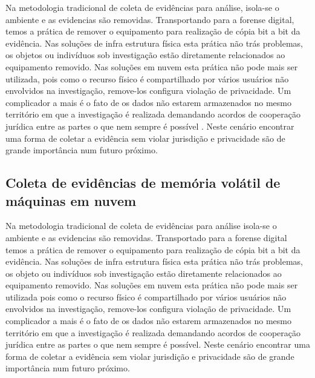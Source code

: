 Na metodologia tradicional de coleta de evidências para análise, isola-se o ambiente e as evidencias são removidas. Transportando para a forense digital, temos a prática de remover o equipamento para realização de cópia bit a bit da evidência.
%
Nas soluções de infra estrutura física esta prática não trás problemas, os objetos ou indivíduos sob investigação estão diretamente relacionados ao equipamento removido.
%
Nas soluções em nuvem esta prática não pode mais ser utilizada, pois como o recurso físico é compartilhado por vários usuários não envolvidos na investigação, remove-los configura violação de privacidade.
%
Um complicador a mais é o fato de os dados não estarem armazenados no mesmo território em que a investigação é realizada demandando acordos de cooperação jurídica entre as partes o que nem sempre é possível \cite{SimouCloudChlng:2014}.
%
Neste cenário encontrar uma forma de coletar a evidência sem violar jurisdição e privacidade são de grande importância num futuro próximo.


\subsection{Coleta de evidências de memória volátil de máquinas em nuvem}
\label{sec:forensenuvem}

Na metodologia tradicional de coleta de evidências para análise isola-se o ambiente e as evidencias são removidas. Transportado para a forense digital temos a prática de remover o equipamento para realização de cópia bit a bit da evidência.
%
Nas soluções de infra estrutura física esta prática não trás problemas, os objeto ou indivíduos sob investigação estão diretamente relacionados ao equipamento removido. 
%
Nas soluções em nuvem esta prática não pode mais ser utilizada pois como o recurso físico é compartilhado por vários usuários não envolvidos na investigação, remove-los configura violação de privacidade.
%
Um complicador a mais é o fato de os dados não estarem armazenados no mesmo território em que a investigação é realizada demandando acordos de cooperação jurídica entre as partes o que nem sempre é possível.
%
Neste cenário encontrar uma forma de coletar a evidência sem violar jurisdição e privacidade são de grande importância num futuro próximo.






